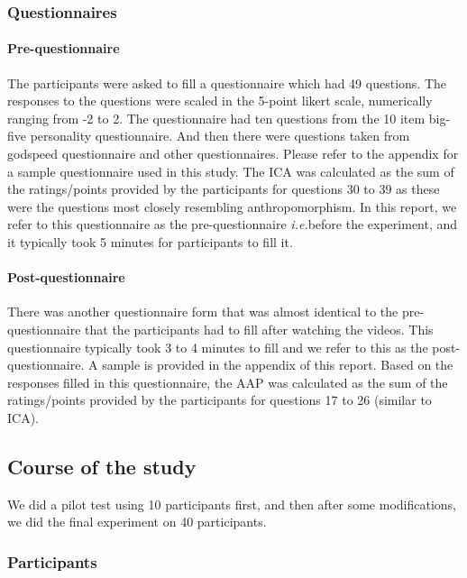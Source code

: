 \documentclass{acm_proc_article-sp}
\newcommand{\ie}{{\textit{i.e.\xspace}}}
\begin{document}
\subsubsection{Questionnaires}

\paragraph{Pre-questionnaire}

The participants were asked to fill a questionnaire which had 49 questions. The
responses to the questions were scaled in the 5-point likert scale, numerically
ranging from -2 to 2. The questionnaire had ten questions from the 10 item
big-five personality questionnaire. And then there were questions taken from
godspeed questionnaire and other questionnaires. Please refer to the appendix
for a sample questionnaire used in this study. The ICA was calculated as the sum
of the ratings/points provided by the participants for questions 30 to 39 as
these were the questions most closely resembling anthropomorphism. In this
report, we refer to this questionnaire as the pre-questionnaire \ie before the
experiment, and it typically took 5 minutes for participants to fill it. 

\paragraph{Post-questionnaire}

There was another questionnaire form that was almost identical to the
pre-questionnaire that the participants had to fill after watching the videos.
This questionnaire typically took 3 to 4 minutes to fill and we refer to this as
the post-questionnaire. A sample is provided in the appendix of this report.
Based on the responses filled in this questionnaire, the AAP was calculated as
the sum of the ratings/points provided by the participants for questions 17 to
26 (similar to ICA).


\subsection{Course of the study}

We did a pilot test using 10 participants first, and then after some
modifications, we did the final experiment on 40 participants.

\subsubsection{Participants}
\end{document}
